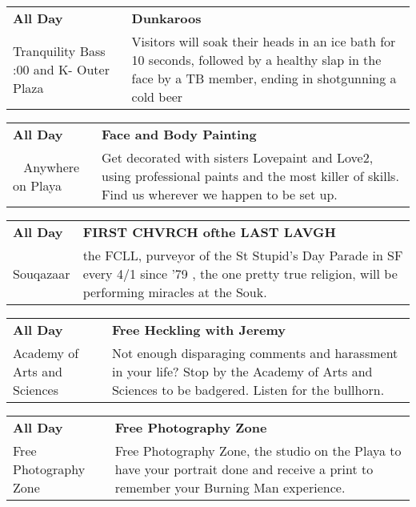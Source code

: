 \begin{tabular}{ p{1in} p{2.2in} }
    \textbf{All Day} & \textbf{Dunkaroos } \\
    Tranquility Bass \newline 9:00 and K- Outer Plaza & Visitors will soak their heads in an ice bath for 10 seconds, followed by a healthy slap in the face by a TB member, ending in shotgunning a cold beer \\
    \hline 
\end{tabular}
    
\begin{tabular}{ p{1in} p{2.2in} }
    \textbf{All Day} & \textbf{Face and Body Painting} \\
    ~ \newline Anywhere on Playa & Get decorated with sisters Lovepaint and Love2, using professional paints and the most killer of skills. Find us wherever we happen to be set up. \\
    \hline 
\end{tabular}
    
\begin{tabular}{ p{1in} p{2.2in} }
    \textbf{All Day} & \textbf{FIRST CHVRCH ofthe LAST LAVGH} \\
    Souqazaar \newline  & the FCLL, purveyor of the St Stupid's Day Parade in SF every 4/1 since '79 , the one pretty true religion, will be performing miracles at the Souk. \\
    \hline 
\end{tabular}
    
\begin{tabular}{ p{1in} p{2.2in} }
    \textbf{All Day} & \textbf{Free Heckling with Jeremy} \\
    Academy of Arts and Sciences \newline  & Not enough disparaging comments and harassment in your life?  Stop by the Academy of Arts and Sciences to be badgered.  Listen for the bullhorn. \\
    \hline 
\end{tabular}
    
\begin{tabular}{ p{1in} p{2.2in} }
    \textbf{All Day} & \textbf{Free Photography Zone} \\
    Free Photography Zone \newline  & Free Photography Zone, the studio on the Playa to have your portrait done and receive a print to remember your Burning Man experience. \\
    \hline 
\end{tabular}
    
